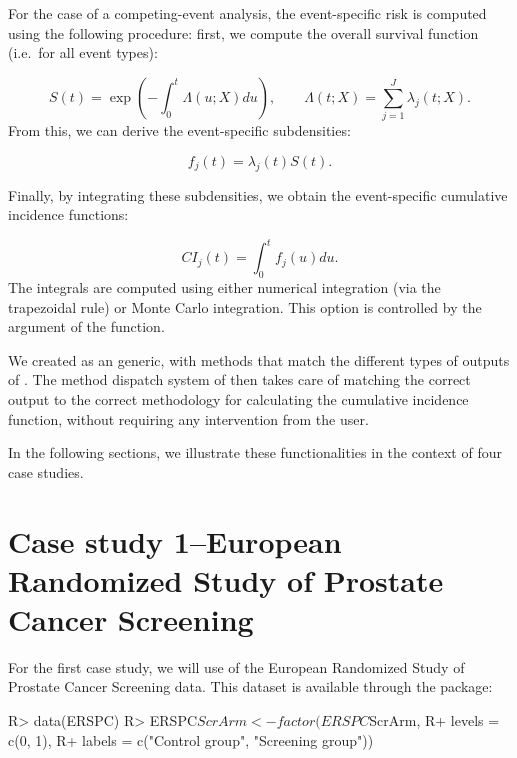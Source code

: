 \documentclass[
]{jss}
\begin{document}
For the case of a competing-event analysis, the event-specific risk is
computed using the following procedure: first, we compute the overall
survival function (i.e.~for all event types):

\[ S(t) = \exp\left(-\int_0^t \Lambda(u;X) du\right),\qquad \Lambda(t;X) = \sum_{j=1}^J \lambda_j(t;X).\]
From this, we can derive the event-specific subdensities:

\[ f_j(t) = \lambda_j(t)S(t).\]

Finally, by integrating these subdensities, we obtain the event-specific
cumulative incidence functions:

\[ CI_j(t) = \int_0^t f_j(u)du.\] The integrals are computed using
either numerical integration (via the trapezoidal rule) or Monte Carlo
integration. This option is controlled by the argument  of
the  function.

We created  as an  generic, with methods
that match the different types of outputs of . The
method dispatch system of  then takes care of matching the
correct output to the correct methodology for calculating the cumulative
incidence function, without requiring any intervention from the user.

In the following sections, we illustrate these functionalities in the
context of four case studies.

\hypertarget{case-study-1european-randomized-study-of-prostate-cancer-screening}{%
\section{Case study 1--European Randomized Study of Prostate Cancer
Screening}\label{case-study-1european-randomized-study-of-prostate-cancer-screening}}

For the first case study, we will use of the European Randomized Study
of Prostate Cancer Screening data. This dataset is available through the
 package:

\begin{CodeChunk}

\begin{CodeInput}
R> data(ERSPC)
R> ERSPC$ScrArm <- factor(ERSPC$ScrArm, 
R+                        levels = c(0, 1), 
R+                        labels = c("Control group", "Screening group"))
\end{CodeInput}
\end{CodeChunk}
\end{document}
